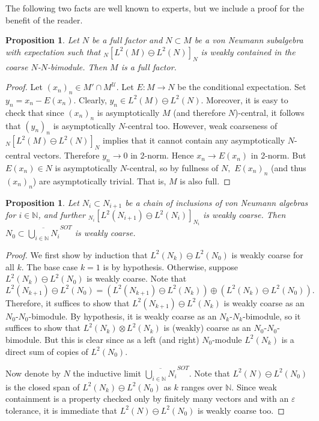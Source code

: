 \documentclass[10pt]{amsart}
\numberwithin{equation}{section}
\newtheorem{prop}[thm]{Proposition}
\theoremstyle{definition}
\newcommand{\N}{\mathbb{N}}
\newcommand{\cU}{\mathcal{U}}
\begin{document}
The following two facts are well known to experts, but we include a proof for the benefit of the reader. 

\begin{prop}\label{prop: full-and-coarse}
Let $N$ be a full factor and $N\subset M$ be a von Neumann subalgebra with expectation such that $_N[L^2(M)\ominus L^2(N)]_N$ is weakly contained in the coarse $N$-$N$-bimodule. Then $M$ is a full factor.
\end{prop}

\begin{proof}
    Let $(x_n)_n \in M' \cap M^\cU$. Let $E:M\to N$ be the conditional expectation. Set $y_n = x_n - E(x_n)$. Clearly, $y_n \in L^2(M)\ominus L^2(N)$. Moreover, it is easy to check that since $(x_n)_n$ is asymptotically $M$ (and therefore $N$)-central, it follows that $(y_n)_n$ is asymptotically $N$-central too. However, weak coarseness of $_N[L^2(M)\ominus L^2(N)]_N$ implies that it cannot contain any asymptotically $N$-central vectors. Therefore $y_n \to 0$ in 2-norm. Hence $x_n \to E(x_n)$ in 2-norm. But $E(x_n) \in N$ is asymptotically $N$-central, so by fullness of $N,$ $E(x_n)_n$ (and thus $(x_n)_n$) are asymptotically trivial. That is, $M$ is also full.
\end{proof}

\begin{prop}\label{prop: lim-of-coarse}
    Let $N_i\subset N_{i+1}$ be a chain of inclusions of von Neumann algebras for $i\in \mathbb{N}$, and further $_{N_{i}}[L^2(N_{i+1})\ominus L^2(N_i)]_{N_{i}}$ is weakly coarse. Then $N_0\subset \overline{\bigcup_{i\in \mathbb{N}}N_i}^{SOT}$ is weakly coarse.
\end{prop}
    

\begin{proof}
    We first show by induction that $L^2(N_k)\ominus L^2(N_0)$ is weakly coarse for all $k.$ The base case $k=1$ is by hypothesis. Otherwise, suppose $L^2(N_k)\ominus L^2(N_0)$ is weakly coarse. Note that
    $$L^2(N_{k+1})\ominus L^2(N_0) = (L^2(N_{k+1})\ominus L^2(N_k)) \oplus (L^2(N_k)\ominus L^2(N_0)).$$
    Therefore, it suffices to show that $L^2(N_{k+1})\ominus L^2(N_k)$ is weakly coarse as an $N_0$-$N_0$-bimodule. By hypothesis, it is weakly coarse as an $N_k$-$N_k$-bimodule, so it suffices to show that $L^2(N_k)\otimes L^2(N_k)$ is (weakly) coarse as an $N_0$-$N_0$-bimodule. But this is clear since as a left (and right) $N_0$-module $L^2(N_k)$ is a direct sum of copies of $L^2(N_0)$.

    Now denote by $N$ the inductive limit $\overline{\bigcup_{i\in \mathbb{N}}N_i}^{SOT}$. Note that $L^2(N) \ominus L^2(N_0)$ is the closed span of $L^2(N_k)\ominus L^2(N_0)$ as $k$ ranges over $\N.$ Since weak containment is a property checked only by finitely many vectors and with an $\varepsilon$ tolerance, it is immediate that $L^2(N)\ominus L^2(N_0)$ is weakly coarse too.
\end{proof}
\end{document}
